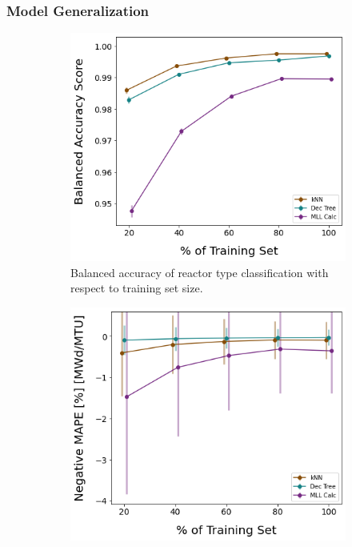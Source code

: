 
\subsubsection{Model Generalization}

\begin{figure}[!htb]
  \centering
  \begin{subfigure}[b]{0.49\textwidth}
    \centering
    \includegraphics[width=\textwidth]{./chapters/exp1/learncurve_nuc29_err01_BalAcc_rxtr.png}
    \caption{Balanced accuracy of reactor type classification with respect 
             to training set size.}
    \label{fig:learnsA01}
  \end{subfigure}
  \hfill
  \begin{subfigure}[b]{0.49\textwidth}
    \centering
    \includegraphics[width=\textwidth]{./chapters/exp1/learncurve_nuc29_err01_MAPE_burn.png}

\end{subfigure}
\end{figure}
